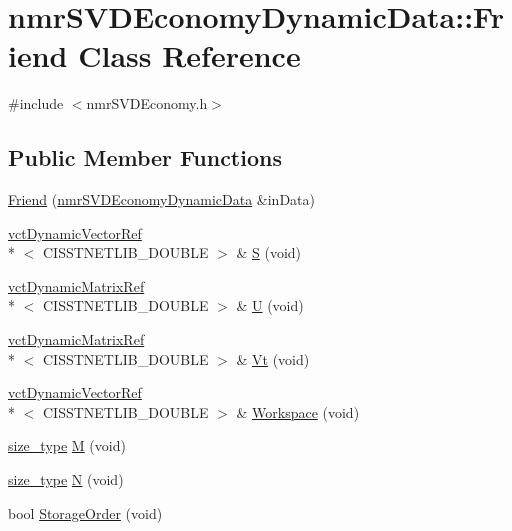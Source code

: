 \hypertarget{classnmr_s_v_d_economy_dynamic_data_1_1_friend}{\section{nmr\-S\-V\-D\-Economy\-Dynamic\-Data\-:\-:Friend Class Reference}
\label{classnmr_s_v_d_economy_dynamic_data_1_1_friend}
}


{\ttfamily \#include $<$nmr\-S\-V\-D\-Economy.\-h$>$}

\subsection*{Public Member Functions}
\begin{DoxyCompactItemize}
\item 
\hyperlink{classnmr_s_v_d_economy_dynamic_data_1_1_friend_ae9bb97c429958aa00c1153b258f29f2e}{Friend} (\hyperlink{classnmr_s_v_d_economy_dynamic_data}{nmr\-S\-V\-D\-Economy\-Dynamic\-Data} \&in\-Data)
\item 
\hyperlink{classvct_dynamic_vector_ref}{vct\-Dynamic\-Vector\-Ref}\\*
$<$ C\-I\-S\-S\-T\-N\-E\-T\-L\-I\-B\-\_\-\-D\-O\-U\-B\-L\-E $>$ \& \hyperlink{classnmr_s_v_d_economy_dynamic_data_1_1_friend_a6656be64eb3abd43143fb22c21add478}{S} (void)
\item 
\hyperlink{classvct_dynamic_matrix_ref}{vct\-Dynamic\-Matrix\-Ref}\\*
$<$ C\-I\-S\-S\-T\-N\-E\-T\-L\-I\-B\-\_\-\-D\-O\-U\-B\-L\-E $>$ \& \hyperlink{classnmr_s_v_d_economy_dynamic_data_1_1_friend_a2bbae77f753e5437a1a117c49eb63222}{U} (void)
\item 
\hyperlink{classvct_dynamic_matrix_ref}{vct\-Dynamic\-Matrix\-Ref}\\*
$<$ C\-I\-S\-S\-T\-N\-E\-T\-L\-I\-B\-\_\-\-D\-O\-U\-B\-L\-E $>$ \& \hyperlink{classnmr_s_v_d_economy_dynamic_data_1_1_friend_a09bced2587257abf09f44849bfffd8da}{Vt} (void)
\item 
\hyperlink{classvct_dynamic_vector_ref}{vct\-Dynamic\-Vector\-Ref}\\*
$<$ C\-I\-S\-S\-T\-N\-E\-T\-L\-I\-B\-\_\-\-D\-O\-U\-B\-L\-E $>$ \& \hyperlink{classnmr_s_v_d_economy_dynamic_data_1_1_friend_a68bcb9bae56f1e8718d7a9e79c5f86cb}{Workspace} (void)
\item 
\hyperlink{classnmr_s_v_d_economy_dynamic_data_aee8ff15f2e92af24fdc3c7f5908770f3}{size\-\_\-type} \hyperlink{classnmr_s_v_d_economy_dynamic_data_1_1_friend_a255990ebed03b6ba23c4f95d50d25f2a}{M} (void)
\item 
\hyperlink{classnmr_s_v_d_economy_dynamic_data_aee8ff15f2e92af24fdc3c7f5908770f3}{size\-\_\-type} \hyperlink{classnmr_s_v_d_economy_dynamic_data_1_1_friend_af6645fd4d5781b66130b3ee3647f7e60}{N} (void)
\item 
bool \hyperlink{classnmr_s_v_d_economy_dynamic_data_1_1_friend_a6b01f286963a7dad4690beb9e4a91fca}{Storage\-Order} (void)
\end{DoxyCompactItemize}


